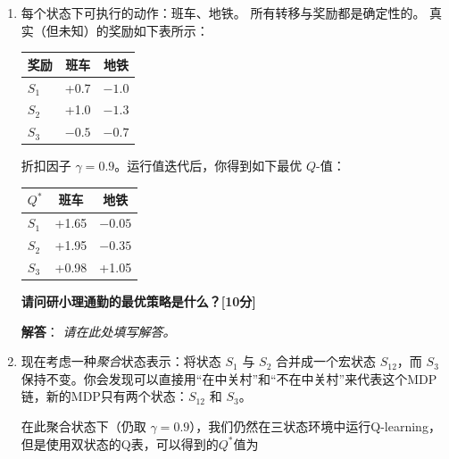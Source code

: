 \documentclass[a4paper,12pt]{article}
\begin{document}
\begin{enumerate}[label=(\roman*)]
\item 每个状态下可执行的动作：\textsc{班车}、\textsc{地铁}。  
所有转移与奖励都是确定性的。  
真实（但未知）的奖励如下表所示：

\begin{table}[h!]
\centering
\begin{tabular}{@{}lcc@{}}
\toprule
奖励 & 班车 & 地铁 \\ \midrule
$S_1$ & +0.7 & $-1.0$ \\
$S_2$ & +1.0 & $-1.3$ \\
$S_3$ & $-0.5$ & $-0.7$ \\ \bottomrule
\end{tabular}
\end{table}
折扣因子 $\gamma = 0.9$。运行值迭代后，你得到如下最优 $Q$-值：

\begin{table}[h!]
\centering
\begin{tabular}{@{}lcc@{}}
\toprule
$Q^*$ & 班车 & 地铁 \\ \midrule
$S_1$ & +1.65 & $-0.05$ \\
$S_2$ & +1.95 & $-0.35$ \\
$S_3$ & +0.98 & +1.05 \\ \bottomrule
\end{tabular}
\end{table}

\textbf{请问研小理通勤的最优策略是什么？[10分]}

\textbf{解答}：
\emph{请在此处填写解答。}
\vspace{1cm}


\item 现在考虑一种\emph{聚合}状态表示：将状态 $S_1$ 与 $S_2$ 合并成一个宏状态 $S_{12}$，而 $S_3$ 保持不变。你会发现可以直接用“在中关村”和“不在中关村”来代表这个MDP链，新的MDP只有两个状态：$S_{12}$ 和 $S_3$。  

在此聚合状态下（仍取 $\gamma = 0.9$），我们仍然在三状态环境中运行Q-learning，但是使用双状态的Q表，可以得到的$Q^*$值为


\end{enumerate}
\end{document}
